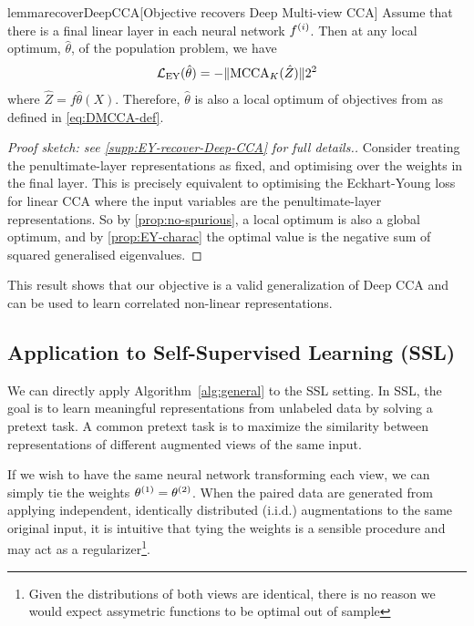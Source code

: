\begin{restatable}{lemma}{recoverDeepCCA}[Objective recovers Deep Multi-view CCA]\label{lem:recover-DeepCCA}
Assume that there is a final linear layer in each neural network $f^{(i)}$.
Then at any local optimum, $\hat{\theta}$, of the population problem, we have
\begin{align*}
\mathcal{L}_\text{EY}(\hat{\theta}) = - \lVert\operatorname{MCCA}_K(\hat{Z})\rVert2^2
\end{align*}
where $\hat{Z} = f{\hat{\theta}}(X)$.
Therefore, $\hat{\theta}$ is also a local optimum of objectives from \citet{andrew2013deep, somandepalli2019multimodal} as defined in \cref{eq:DMCCA-def}.
\end{restatable}

\begin{proof}[Proof sketch: see \cref{supp:EY-recover-Deep-CCA} for full details.]
Consider treating the penultimate-layer representations as fixed, and optimising over the weights in the final layer.
This is precisely equivalent to optimising the Eckhart-Young loss for linear CCA where the input variables are the penultimate-layer representations.
So by \cref{prop:no-spurious}, a local optimum is also a global optimum, and by \cref{prop:EY-charac} the optimal value is the negative sum of squared generalised eigenvalues.
\end{proof}

This result shows that our objective is a valid generalization of Deep CCA and can be used to learn correlated non-linear representations.

\subsection{Application to Self-Supervised Learning (SSL)}

We can directly apply Algorithm~\ref{alg:general} to the SSL setting. In SSL, the goal is to learn meaningful representations from unlabeled data by solving a pretext task. A common pretext task is to maximize the similarity between representations of different augmented views of the same input.

If we wish to have the same neural network transforming each view, we can simply tie the weights $\theta^{(1)} = \theta^{(2)}$. When the paired data are generated from applying independent, identically distributed (i.i.d.) augmentations to the same original input, it is intuitive that tying the weights is a sensible procedure and may act as a regularizer\footnote{Given the distributions of both views are identical, there is no reason we would expect assymetric functions to be optimal out of sample}.

